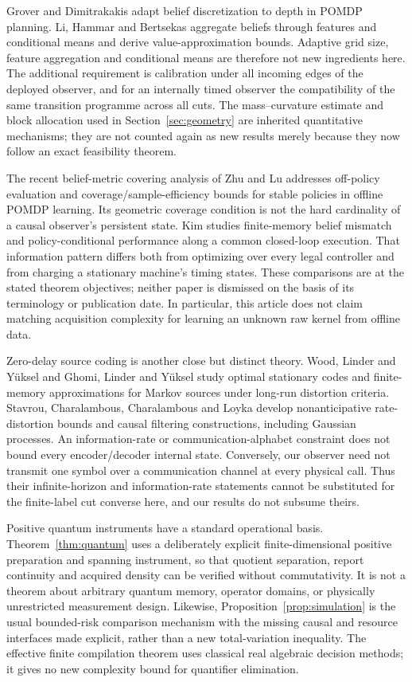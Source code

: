 Grover and Dimitrakakis\cite{grover} adapt belief discretization to depth in POMDP planning. Li, Hammar and Bertsekas\cite{li} aggregate beliefs through features and conditional means and derive value-approximation bounds. Adaptive grid size, feature aggregation and conditional means are therefore not new ingredients here. The additional requirement is calibration under all incoming edges of the deployed observer, and for an internally timed observer the compatibility of the same transition programme across all cuts. The mass--curvature estimate and block allocation used in Section~\ref{sec:geometry} are inherited quantitative mechanisms\cite{prior}; they are not counted again as new results merely because they now follow an exact feasibility theorem.

The recent belief-metric covering analysis of Zhu and Lu\cite{zhu} addresses off-policy evaluation and coverage/sample-efficiency bounds for stable policies in offline POMDP learning. Its geometric coverage condition is not the hard cardinality of a causal observer's persistent state. Kim\cite{kim} studies finite-memory belief mismatch and policy-conditional performance along a common closed-loop execution. That information pattern differs both from optimizing over every legal controller and from charging a stationary machine's timing states. These comparisons are at the stated theorem objectives; neither paper is dismissed on the basis of its terminology or publication date. In particular, this article does not claim matching acquisition complexity for learning an unknown raw kernel from offline data.

Zero-delay source coding is another close but distinct theory. Wood, Linder and Y\"uksel\cite{wood} and Ghomi, Linder and Y\"uksel\cite{ghomi} study optimal stationary codes and finite-memory approximations for Markov sources under long-run distortion criteria. Stavrou, Charalambous, Charalambous and Loyka\cite{stavrou} develop nonanticipative rate-distortion bounds and causal filtering constructions, including Gaussian processes. An information-rate or communication-alphabet constraint does not bound every encoder/decoder internal state. Conversely, our observer need not transmit one symbol over a communication channel at every physical call. Thus their infinite-horizon and information-rate statements cannot be substituted for the finite-label cut converse here, and our results do not subsume theirs.

Positive quantum instruments have a standard operational basis\cite{davies}. Theorem~\ref{thm:quantum} uses a deliberately explicit finite-dimensional positive preparation and spanning instrument, so that quotient separation, report continuity and acquired density can be verified without commutativity. It is not a theorem about arbitrary quantum memory, operator domains, or physically unrestricted measurement design. Likewise, Proposition~\ref{prop:simulation} is the usual bounded-risk comparison mechanism\cite{lecam} with the missing causal and resource interfaces made explicit, rather than a new total-variation inequality. The effective finite compilation theorem uses classical real algebraic decision methods\cite{bpr}; it gives no new complexity bound for quantifier elimination.

